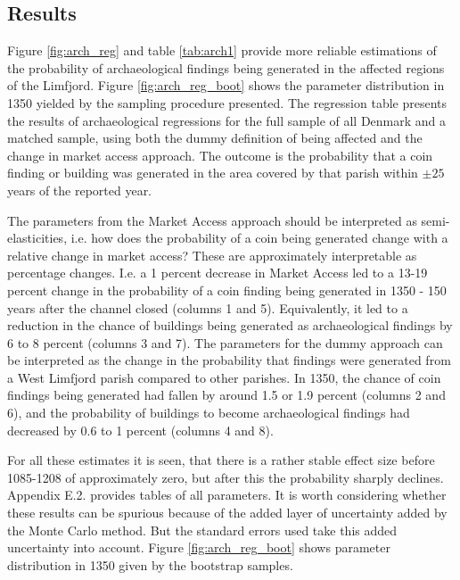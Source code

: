 \documentclass[11pt]{article}
\begin{document}
\FloatBarrier
\subsection{Results}

Figure \ref{fig:arch_reg} and table \ref{tab:arch1} provide more reliable estimations of the probability of archaeological findings being generated in the affected regions of the Limfjord. Figure \ref{fig:arch_reg_boot} shows the parameter distribution in 1350 yielded by the sampling procedure presented. The regression table presents the results of archaeological regressions for the full sample of all Denmark and a matched sample, using both the dummy definition of being affected and the change in market access approach. The outcome is the probability that a coin finding or building was generated in the area covered by that parish within $\pm 25$ years of the reported year. 

The parameters from the Market Access approach should be interpreted as semi-elasticities, i.e. how does the probability of a coin being generated change with a relative change in market access? These are approximately interpretable as percentage changes. I.e. a 1 percent decrease in Market Access led to a 13-19 percent change in the probability of a coin finding being generated in 1350 - 150 years after the channel closed (columns 1 and 5). Equivalently, it led to a reduction in the chance of buildings being generated as archaeological findings by 6 to 8 percent (columns 3 and 7). The parameters for the dummy approach can be interpreted as the change in the probability that findings were generated from a West Limfjord parish compared to other parishes. In 1350, the chance of coin findings being generated had fallen by around 1.5 or 1.9 percent  (columns 2 and 6), and the probability of buildings to become archaeological findings had decreased by 0.6 to 1 percent (columns 4 and 8). 

For all these estimates it is seen, that there is a rather stable effect size before 1085-1208 of approximately zero, but after this the probability sharply declines. Appendix E.2. provides tables of all parameters. It is worth considering whether these results can be spurious because of the added layer of uncertainty added by the Monte Carlo method. But the standard errors used take this added uncertainty into account. Figure \ref{fig:arch_reg_boot} shows parameter distribution in 1350 given by the bootstrap samples.
\end{document}
